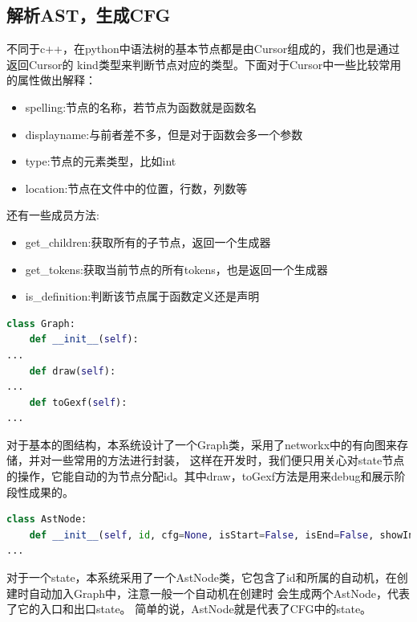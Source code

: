 \subsection{解析AST，生成CFG}
不同于c++，在python中语法树的基本节点都是由Cursor组成的，我们也是通过返回Cursor的
kind类型来判断节点对应的类型。下面对于Cursor中一些比较常用的属性做出解释：
\begin{itemize}
	\item spelling:节点的名称，若节点为函数就是函数名
	\item displayname:与前者差不多，但是对于函数会多一个参数
	\item type:节点的元素类型，比如int
	\item location:节点在文件中的位置，行数，列数等
\end{itemize}
 还有一些成员方法:
\begin{itemize}
	\item get\_children:获取所有的子节点，返回一个生成器
	\item get\_tokens:获取当前节点的所有tokens，也是返回一个生成器
    \item is\_definition:判断该节点属于函数定义还是声明
\end{itemize}
{\small
\begin{lstlisting}[language=Python,caption=Graph]
class Graph:
    def __init__(self):
...
    def draw(self):
...
    def toGexf(self):
...
\end{lstlisting}
}
对于基本的图结构，本系统设计了一个Graph类，采用了networkx中的有向图来存储，并对一些常用的方法进行封装，
这样在开发时，我们便只用关心对state节点的操作，它能自动的为节点分配id。其中draw，toGexf方法是用来debug和展示阶段性成果的。
{\small
\begin{lstlisting}[language=Python,caption=StateNode]
class AstNode:
    def __init__(self, id, cfg=None, isStart=False, isEnd=False, showInSubGraph=False):
...
\end{lstlisting}
}
对于一个state，本系统采用了一个AstNode类，它包含了id和所属的自动机，在创建时自动加入Graph中，注意一般一个自动机在创建时
会生成两个AstNode，代表了它的入口和出口state。
简单的说，AstNode就是代表了CFG中的state。
                   

